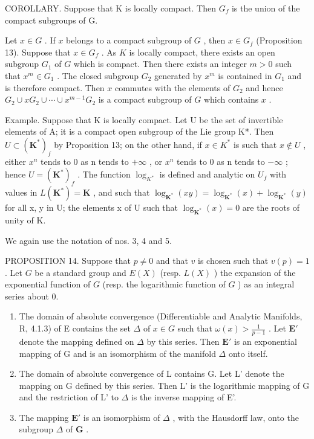 COROLLARY. Suppose that K is locally compact. Then \(G_{f}\) is the union of the compact subgroups of G.

Let \(x \in G\) . If \(x\) belongs to a compact subgroup of \(G\) , then \(x \in G_f\) (Proposition 13). Suppose that \(x \in G_f\) . As \(K\) is locally compact, there exists an open subgroup \(G_1\) of \(G\) which is compact. Then there exists an integer \(m > 0\) such that \(x^m \in G_1\) . The closed subgroup \(G_2\) generated by \(x^m\) is contained in \(G_1\) and is therefore compact. Then \(x\) commutes with the elements of \(G_2\) and hence \(G_2 \cup xG_2 \cup \cdots \cup x^{m-1}G_2\) is a compact subgroup of \(G\) which contains \(x\) .

Example. Suppose that K is locally compact. Let U be the set of invertible elements of A; it is a compact open subgroup of the Lie group K*. Then \(U \subset (\mathbf{K}^{*})_{f}\) by Proposition 13; on the other hand, if \(x \in K^{*}\) is such that \(x \notin U\) , either \(x^{n}\) tends to 0 as n tends to \(+\infty\) , or \(x^{n}\) tends to 0 as n tends to \(-\infty\) ; hence \(U = (\mathbf{K}^{*})_{f}\) . The function \(\log_{K^{*}}\) is defined and analytic on \(U_{f}\) with values in \(L(\mathbf{K}^{*}) = \mathbf{K}\) , and such that \(\log_{\mathbf{K}^{*}}(xy) = \log_{\mathbf{K}^{*}}(x) + \log_{\mathbf{K}^{*}}(y)\) for all x, y in U; the elements x of U such that \(\log_{\mathbf{K}^{*}}(x) = 0\) are the roots of unity of K.

We again use the notation of nos. 3, 4 and 5.

PROPOSITION 14. Suppose that \(p \neq 0\) and that \(v\) is chosen such that \(v(p) = 1\) . Let \(G\) be a standard group and \(E(X)\) (resp. \(L(X)\) ) the expansion of the exponential function of \(G\) (resp. the logarithmic function of \(G\) ) as an integral series about 0.

\begin{enumerate}
\def\labelenumi{(\roman{enumi})}
\item
  The domain of absolute convergence (Differentiable and Analytic Manifolds, R, 4.1.3) of E contains the set \(\Delta\) of \(x \in G\) such that \(\omega(x) > \frac{1}{p - 1}\) . Let \(\mathbf{E}'\) denote the mapping defined on \(\Delta\) by this series. Then \(\mathbf{E}'\) is an exponential mapping of G and is an isomorphism of the manifold \(\Delta\) onto itself.
\item
  The domain of absolute convergence of L contains G. Let L' denote the mapping on G defined by this series. Then L' is the logarithmic mapping of G and the restriction of L' to \(\Delta\) is the inverse mapping of E'.
\item
  The mapping \(\mathbf{E}'\) is an isomorphism of \(\Delta\) , with the Hausdorff law, onto the subgroup \(\Delta\) of \(\mathbf{G}\) .
\end{enumerate}

